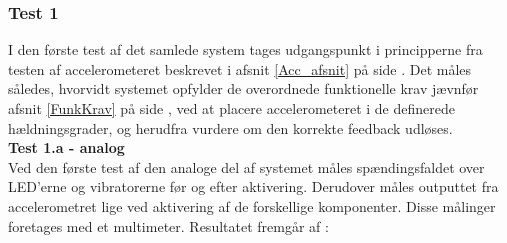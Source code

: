 \subsubsection{Test 1}
I den første test af det samlede system tages udgangspunkt i principperne fra testen af accelerometeret beskrevet i afsnit \ref{Acc_afsnit} på side \pageref{Acc_afsnit}. Det måles således, hvorvidt systemet opfylder de overordnede funktionelle krav jævnfør afsnit \ref{FunkKrav} på side \pageref{FunkKrav}, ved at placere accelerometeret i de definerede hældningsgrader, og herudfra vurdere om den korrekte feedback udløses.\\ 

\noindent\textbf{Test 1.a - analog}\\  
Ved den første test af den analoge del af systemet måles spændingsfaldet over LED'erne og vibratorerne før og efter aktivering. Derudover måles outputtet fra accelerometret lige ved aktivering af de forskellige komponenter. Disse målinger foretages med et multimeter. Resultatet fremgår af :
